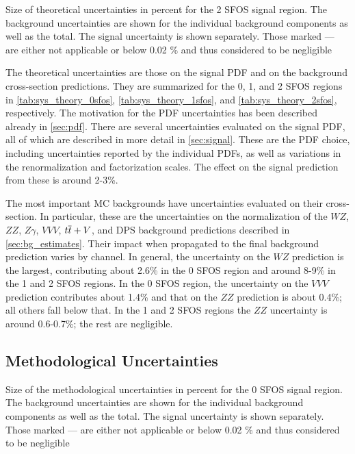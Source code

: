 \begin{table}[ht]
\centering

\caption{Size of theoretical uncertainties in percent for the 2 SFOS signal region. The background uncertainties are shown for the individual background components as well as the total. The signal uncertainty is shown separately. Those marked --- are either not applicable or below 0.02 \% and thus considered to be negligible}
\label{tab:sys_theory_2sfos}
\end{table}

The theoretical uncertainties are those on the signal PDF and 
on the background cross-section predictions.
They are summarized for the 0, 1, and 2 SFOS regions
in \tab\ref{tab:sys_theory_0sfos}, 
\tab\ref{tab:sys_theory_1sfos}, and
\tab\ref{tab:sys_theory_2sfos}, respectively.
The motivation for the PDF uncertainties has been described
already in \sec\ref{sec:pdf}. 
There are several uncertainties evaluated on the signal PDF, all of which
are described in more detail in \sec\ref{sec:signal}. These
are the PDF choice, including uncertainties reported by the individual
PDFs, as well as variations in the renormalization and factorization scales.
The effect on the signal prediction from these is around 2-3\%.

The most important MC backgrounds have uncertainties evaluated on their
cross-section.  In particular, these are the uncertainties on the 
normalization of the $WZ$, $ZZ$, $Z\gamma$, $VVV$, $t\overline{t}+V$, 
and DPS background predictions
described in \sec\ref{sec:bg_estimates}.
Their impact when propagated to the final background prediction
varies by channel. In general, the uncertainty on the $WZ$ prediction is the 
largest, contributing about 2.6\% in the 0 SFOS region and around 8-9\%
in the 1 and 2 SFOS regions.  In the 0 SFOS region, the uncertainty 
on the $VVV$ prediction contributes about 1.4\% and that on the $ZZ$ prediction
is about 0.4\%; all others fall below that. 
In the 1 and 2 SFOS regions the $ZZ$ uncertainty is around 0.6-0.7\%; the
rest are negligible. 

\subsection{Methodological Uncertainties}

\begin{table}[ht!]
\centering

\caption{Size of the methodological uncertainties in percent for the 0 SFOS signal region. The background uncertainties are shown for the individual background components as well as the total. The signal uncertainty is shown separately. Those marked --- are either not applicable or below 0.02 \% and thus considered to be negligible}
\label{tab:sys_meth_0sfos}
\end{table}


